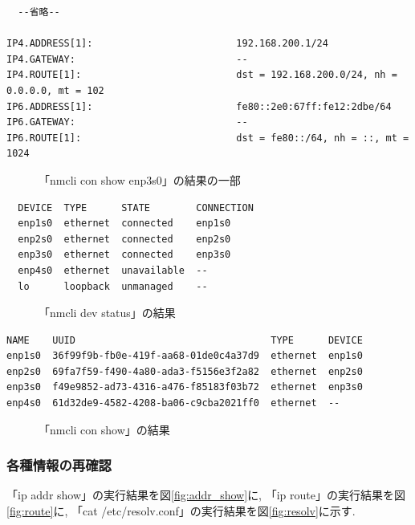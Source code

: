 \documentclass{ltjsarticle} %
\begin{document}
\begin{mdframed}
\begin{verbatim}
  --省略--

IP4.ADDRESS[1]:                         192.168.200.1/24
IP4.GATEWAY:                            --
IP4.ROUTE[1]:                           dst = 192.168.200.0/24, nh = 0.0.0.0, mt = 102
IP6.ADDRESS[1]:                         fe80::2e0:67ff:fe12:2dbe/64
IP6.GATEWAY:                            --
IP6.ROUTE[1]:                           dst = fe80::/64, nh = ::, mt = 1024
  \end{verbatim}
  \end{mdframed}
  \begin{figure}[H]
  \caption{「nmcli con show enp3s0」の結果の一部}
  \label{fig:enp3s0}
\end{figure}

\begin{mdframed}
  \begin{verbatim}
  DEVICE  TYPE      STATE        CONNECTION
  enp1s0  ethernet  connected    enp1s0
  enp2s0  ethernet  connected    enp2s0
  enp3s0  ethernet  connected    enp3s0
  enp4s0  ethernet  unavailable  --
  lo      loopback  unmanaged    --
  \end{verbatim}
  \end{mdframed}
  \begin{figure}[H]
  \caption{「nmcli dev status」の結果}
  \label{fig:status2}
\end{figure}

\begin{mdframed}
  \begin{verbatim}
NAME    UUID                                  TYPE      DEVICE
enp1s0  36f99f9b-fb0e-419f-aa68-01de0c4a37d9  ethernet  enp1s0
enp2s0  69fa7f59-f490-4a80-ada3-f5156e3f2a82  ethernet  enp2s0
enp3s0  f49e9852-ad73-4316-a476-f85183f03b72  ethernet  enp3s0
enp4s0  61d32de9-4582-4208-ba06-c9cba2021ff0  ethernet  --
  \end{verbatim}
  \end{mdframed}
  \begin{figure}[H]
  \caption{「nmcli con show」の結果}
  \label{fig:con_show2}
\end{figure}


\subsubsection{各種情報の再確認}
「ip addr show」の実行結果を図\ref{fig:addr_show}に, 
「ip route」の実行結果を図\ref{fig:route}に,
「cat /etc/resolv.conf」の実行結果を図\ref{fig:resolv}に示す. 
\end{document}
